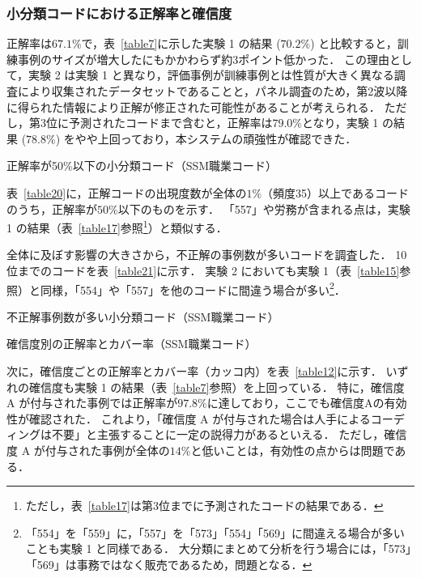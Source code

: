 \documentclass[japanese]{jnlp_1.4}
\begin{document}
\subsubsection{小分類コードにおける正解率と確信度}

正解率は$67.1\%$で，表~\ref{table7}に示した実験 1 の結果 ($70.2\%$) と比較すると，訓練事例のサイズが増大したにもかかわらず約3ポイント低かった．
この理由として，実験 2 は実験 1 と異なり，評価事例が訓練事例とは性質が大きく異なる調査により収集されたデータセットであることと，パネル調査のため，第2波以降に得られた情報により正解が修正された可能性があることが考えられる．
ただし，第3位に予測されたコードまで含むと，正解率は$79.0\%$となり，実験 1 の結果 ($78.8\%$) をやや上回っており，本システムの頑強性が確認できた．

\begin{table}[b]
\caption{正解率が50\%以下の小分類コード（SSM職業コード）}
\label{table20}

\end{table}

表~\ref{table20}に，正解コードの出現度数が全体の$1\%$（頻度35）以上であるコードのうち，正解率が$50\%$以下のものを示す．
「557」や労務が含まれる点は，実験 1 の結果（表~\ref{table17}参照\footnote{ただし，表~\ref{table17}は第3位までに予測されたコードの結果である．}）と類似する．

全体に及ぼす影響の大きさから，不正解の事例数が多いコードを調査した．
10位までのコードを表~\ref{table21}に示す．
実験 2 においても実験 1（表~\ref{table15}参照）と同様，「554」や「557」を他のコードに間違う場合が多い\footnote{「554」を「559」に，「557」を「573」「554」「569」に間違える場合が多いことも実験 1 と同様である．
大分類にまとめて分析を行う場合には，「573」「569」は事務ではなく販売であるため，問題となる．}．

\begin{table}[b]
\caption{不正解事例数が多い小分類コード（SSM職業コード）}
\label{table21}

\end{table}
\begin{table}[b]
\caption{確信度別の正解率とカバー率（SSM職業コード）}
\label{table12}

\end{table}


次に，確信度ごとの正解率とカバー率（カッコ内）を表~\ref{table12}に示す．
いずれの確信度も実験 1 の結果（表~\ref{table7}参照）を上回っている．
特に，確信度 A が付与された事例では正解率が$97.8\%$に達しており，ここでも確信度Aの有効性が確認された．
これより，「確信度 A が付与された場合は人手によるコーディングは不要」と主張することに一定の説得力があるといえる．
ただし，確信度 A が付与された事例が全体の$14\%$と低いことは，有効性の点からは問題である．
\end{document}
